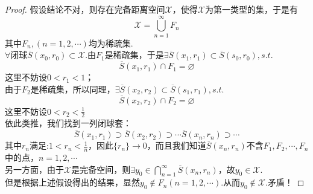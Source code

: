 \documentclass[12pt, a4paper, oneside]{ctexbook}
\begin{document}
	\begin{proof}
		假设结论不对，则存在完备距离空间$\mathscr{X}$，使得$\mathscr{X}$为第一类型的集，于是有\begin{equation*}
			\mathscr{X}=\bigcup_{n=1}^{\infty}F_n
		\end{equation*}
		其中$F_n, (n=1,2,\cdots)$均为稀疏集.\\
		$\forall$闭球$\overline{S}(x_0,r_0)\subset \mathscr{X}$.由$F_1$是稀疏集，于是$\exists
		\overline{S}(x_1,r_1)\subset \overline{S}(s_0,r_0),s.t. $\begin{equation*}
			\overline{S}(x_1,r_1)\cap F_1=\varnothing
		\end{equation*}
		这里不妨设$0<r_1<1$；\\
		由于$F_2$是稀疏集，所以同理，$\exists \overline{S}(x_2,r_2)\subset
		\overline{S}(s_1,r_1),s.t. $\begin{equation*}
			\overline{S}(x_2,r_2)\cap F_2=\varnothing
		\end{equation*}
		这里不妨设$0<r_2<\frac{1}{2}$\\
		依此类推，我们找到一列闭球套：\begin{equation*}
			\overline{S}(x_1,r_1)\supset \overline{S}(x_2,r_2)\supset \cdots
			\overline{S}(x_n,r_n)\supset\cdots
		\end{equation*}
		其中$r_n$满足:$1<r_n<\frac{1}{n}$，因此$\{r_n\}\to
		0$，而且我们知道$\overline{S}(x_n,r_n)$不含$F_1,F_2,\cdots,F_n$中的点，$n=1,2,\cdots$ \\
		另一方面，由于$\mathscr{X}$是完备空间，则$\exists y_0\in
		\bigcap_{n=1}^{\infty}\overline{S}(x_n,r_n)$，故$y_0\in\mathscr{X}.$\\
		但是根据上述假设得出的结果，显然$y_0\notin F_n(n=1,2,\cdots).$从而$y_0\notin \mathscr{X}.$矛盾！
	\end{proof}
\end{document}
